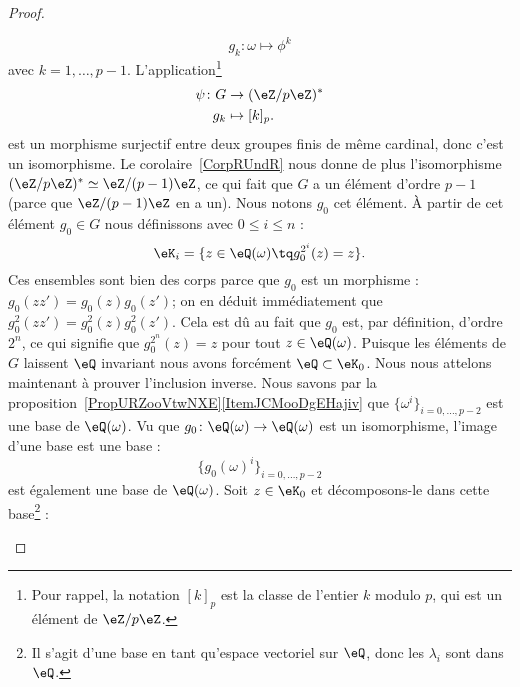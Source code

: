 \begin{proof}
\begin{subproof}
\begin{subproof}
			\begin{equation}
				g_k\colon \omega\mapsto \phi^k
			\end{equation}
			avec \( k=1,\ldots, p-1\). L'application\footnote{Pour rappel, la notation \( [k]_p\) est la classe de l'entier \( k\) modulo \( p\), qui est un élément de \( \eZ/p\eZ\).}
			\begin{equation}
				\begin{aligned}
					\psi\colon G & \to (\eZ/p\eZ)^* \\
					g_k          & \mapsto [k]_p .
				\end{aligned}
			\end{equation}
			est un morphisme surjectif entre deux groupes finis de même cardinal, donc c'est un isomorphisme. Le corolaire~\ref{CorpRUndR} nous donne de plus l'isomorphisme \( (\eZ/p\eZ)^*\simeq \eZ/(p-1)\eZ\), ce qui fait que \( G\) a un élément d'ordre \( p-1\) (parce que \( \eZ/(p-1)\eZ\) en a un). Nous notons \( g_0\) cet élément.
			À partir de cet élément \( g_0\in G\) nous définissons avec \( 0\leq i\leq n\) :
			\begin{equation}
				\eK_i=\{ z\in \eQ(\omega)\tq g_0^{2^i}(z)=z \}.
			\end{equation}
			Ces ensembles sont bien des corps parce que \( g_0\) est un morphisme : \( g_0(zz')=g_0(z)g_0(z')\); on en déduit immédiatement que \( g_0^2(zz')=g_0^2(z)g_0^2(z')\).
			\spitem[\( \eK_n=\eQ(\omega)\)]
			Cela est dû au fait que \( g_0\) est, par définition, d'ordre \( 2^n\), ce qui signifie que \( g_0^{2^n}(z)=z\) pour tout \( z\in \eQ(\omega)\).
			\spitem[\( \eK_0=\eQ\)]
			Puisque les éléments de \( G\) laissent \( \eQ\) invariant nous avons forcément \( \eQ\subset \eK_0\). Nous nous attelons maintenant à prouver l'inclusion inverse. Nous savons par la proposition~\ref{PropURZooVtwNXE}\ref{ItemJCMooDgEHajiv} que \( \{ \omega^i \}_{i=0,\ldots, p-2}\) est une base de \( \eQ(\omega)\). Vu que \( g_0\colon \eQ(\omega)\to \eQ(\omega)\) est un isomorphisme, l'image d'une base est une base :
			\begin{equation}
				\{ g_0(\omega)^i \}_{i=0,\ldots, p-2}
			\end{equation}
			est également une base de \( \eQ(\omega)\). Soit \( z\in \eK_0\) et décomposons-le dans cette base\footnote{Il s'agit d'une base en tant qu'espace vectoriel sur \( \eQ\), donc les \( \lambda_i\) sont dans \( \eQ\).} :

\end{subproof}
\end{subproof}
\end{proof}
